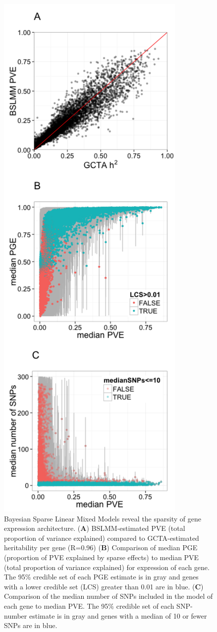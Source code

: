 \documentclass[]{article}
\begin{document}
\begin{figure}[htbp]
\centering
\includegraphics{GenArch_manuscript_files/figure-latex/dgnBSLMM-1.pdf}
\caption{Bayesian Sparse Linear Mixed Models reveal the sparsity of gene
expression architecture. (\textbf{A}) BSLMM-estimated PVE (total
proportion of variance explained) compared to GCTA-estimated
heritability per gene (R=0.96) (\textbf{B}) Comparison of median PGE
(proportion of PVE explained by sparse effects) to median PVE (total
proportion of variance explained) for expression of each gene. The 95\%
credible set of each PGE estimate is in gray and genes with a lower
credible set (LCS) greater than 0.01 are in blue. (\textbf{C})
Comparison of the median number of SNPs included in the model of each
gene to median PVE. The 95\% credible set of each SNP-number estimate is
in gray and genes with a median of 10 or fewer SNPs are in blue.}
\end{figure}
\end{document}
